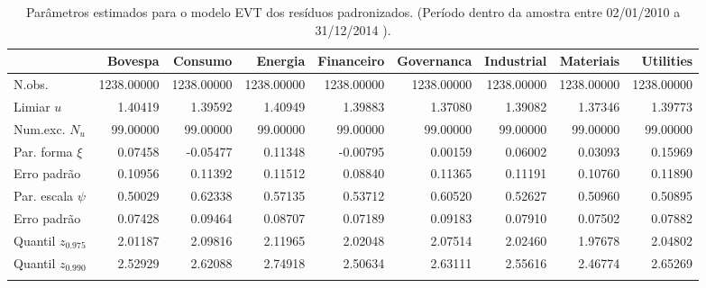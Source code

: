 \begin{longtable}{lrrrrrrrr}
\caption{Parâmetros estimados para o modelo EVT dos resíduos padronizados. 
               (Período dentro da amostra entre 02/01/2010 a 31/12/2014 ).} \\ 
  \toprule
 & Bovespa & Consumo & Energia & Financeiro & Governanca & Industrial & Materiais & Utilities \\ 
  \midrule
N.obs. & 1238.00000 & 1238.00000 & 1238.00000 & 1238.00000 & 1238.00000 & 1238.00000 & 1238.00000 & 1238.00000 \\ 
  Limiar $u$ & 1.40419 & 1.39592 & 1.40949 & 1.39883 & 1.37080 & 1.39082 & 1.37346 & 1.39773 \\ 
  Num.exc. $N_u$ & 99.00000 & 99.00000 & 99.00000 & 99.00000 & 99.00000 & 99.00000 & 99.00000 & 99.00000 \\ 
  Par. forma $\xi$ & 0.07458 & -0.05477 & 0.11348 & -0.00795 & 0.00159 & 0.06002 & 0.03093 & 0.15969 \\ 
  Erro padrão & 0.10956 & 0.11392 & 0.11512 & 0.08840 & 0.11365 & 0.11191 & 0.10760 & 0.11890 \\ 
  Par. escala $\psi$ & 0.50029 & 0.62338 & 0.57135 & 0.53712 & 0.60520 & 0.52627 & 0.50960 & 0.50895 \\ 
  Erro padrão & 0.07428 & 0.09464 & 0.08707 & 0.07189 & 0.09183 & 0.07910 & 0.07502 & 0.07882 \\ 
  Quantil $z_{0.975}$ & 2.01187 & 2.09816 & 2.11965 & 2.02048 & 2.07514 & 2.02460 & 1.97678 & 2.04802 \\ 
  Quantil $z_{0.990}$ & 2.52929 & 2.62088 & 2.74918 & 2.50634 & 2.63111 & 2.55616 & 2.46774 & 2.65269 \\ 
   \bottomrule
\label{tab:evtcoef}
\end{longtable}
